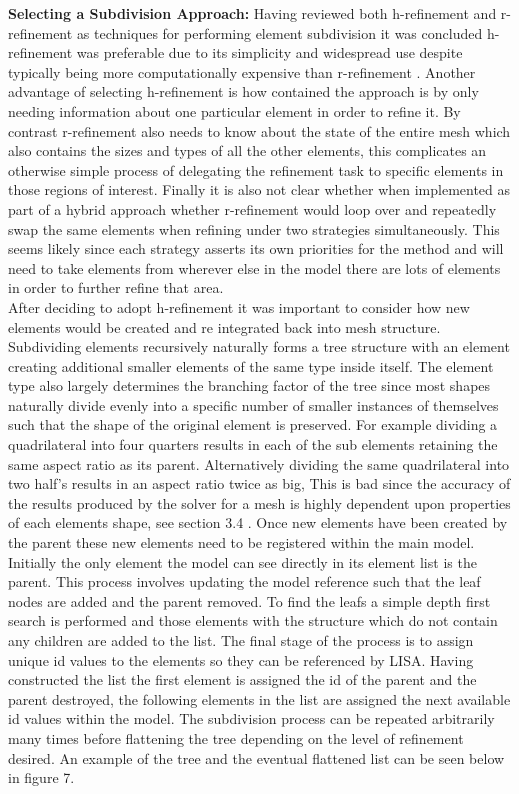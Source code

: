 \noindent
\textbf{Selecting a Subdivision Approach: }  Having reviewed both h-refinement \cite{HandPRefinements} and r-refinement \cite{RRefinement} as techniques for performing element subdivision it was concluded h-refinement was preferable due to its simplicity and widespread use despite typically being more computationally expensive than r-refinement \cite{HandPRefinements, RRefinement}. Another advantage of selecting h-refinement is how contained the approach is by only needing information about one particular element in order to refine it. By contrast r-refinement also needs to know about the state of the entire mesh which also contains the sizes and types of all the other elements, this  complicates an otherwise simple process of delegating the refinement task to specific elements in those regions of interest. Finally it is also not clear whether when implemented as part of a hybrid approach whether r-refinement would loop over and repeatedly swap the same elements when refining under two strategies simultaneously. This seems likely since each strategy asserts its own priorities for the method and will need to take elements from wherever else in the model there are lots of elements in order to further refine that area. \\ 


\noindent
After deciding to adopt h-refinement it was important to consider how new elements would be created and re integrated back into mesh structure. Subdividing elements recursively naturally forms a tree structure with an element creating additional smaller elements of the same type inside itself. The element type also largely determines the branching factor of the tree since most shapes naturally divide evenly into a specific number of smaller instances of themselves such that the shape of the original element is preserved. For example dividing a quadrilateral into four quarters results in each of the sub elements retaining the same aspect ratio as its parent. Alternatively dividing the same quadrilateral into two half's results in an aspect ratio twice as big, This is bad since the accuracy of the results produced by the solver for a mesh is highly dependent upon properties of each elements shape, see section 3.4 \cite{DittmerMeshQualityMet}. Once new elements have been created by the parent these new elements need to be registered within the main model. Initially the only element the model can see directly in its element list is the parent. This process involves updating the model reference such that the leaf nodes are added and the parent removed. To find the leafs a simple depth first search is performed and those elements with the structure which do not contain any children are added to the list. The final stage of the process is to assign unique id values to the elements so they can be referenced by LISA. Having constructed the list the first element is assigned the id of the parent and the parent destroyed, the following elements in the list are assigned the next available id values within the model. The subdivision process can be repeated arbitrarily many times before flattening the tree depending on the level of refinement desired. An example of the tree and the eventual flattened list can be seen below in figure 7. \\



